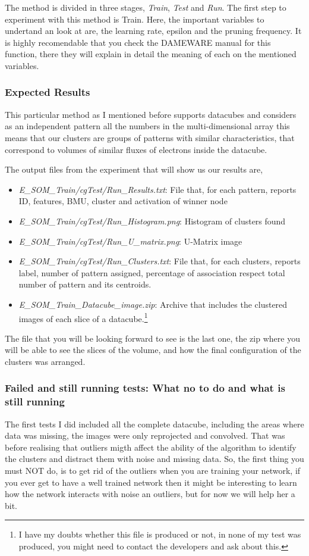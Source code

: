 \documentclass[11pt,fleqn]{book} %
\begin{document}
The method is divided in three stages, \emph{Train}, \emph{Test} and \emph{Run}.
The first step to experiment with this method is Train. Here, the important variables to undertand an look at are, the learning rate, epsilon and the pruning frequency. It is highly recomendable that you check the DAMEWARE manual for this function, there they will explain in detail the meaning of each on the mentioned variables.
\subsubsection{Expected Results}
	This particular method as I mentioned before supports datacubes and considers as an independent pattern all the  numbers in the multi-dimensional array this means that our clusters are groups of patterns with similar characteristics, that correspond to volumes of similar fluxes of electrons inside the datacube.
    
    The output files from the experiment that will show us our results are, 
    \begin{itemize}
    	\item \emph{E\_SOM\_Train/cgTest/Run\_Results.txt}: File that, for each pattern, 
reports ID, features, BMU, cluster and activation of winner node
		\item \emph{E\_SOM\_Train/cgTest/Run\_Histogram.png}: Histogram of clusters found 
        \item \emph{E\_SOM\_Train/cgTest/Run\_U\_matrix.png}: U-Matrix image 
        \item \emph{E\_SOM\_Train/cgTest/Run\_Clusters.txt}: File that, for each clusters, reports label, number of pattern assigned, percentage of association respect total number of pattern and its centroids. 
        \item \emph{E\_SOM\_Train\_Datacube\_image.zip}: Archive that includes the 
clustered images of each slice of a datacube.\footnote{I have my doubts whether this file is produced or not, in none of my test was produced, you might need to contact the developers and ask about this.}
    \end{itemize}
The file that you will be looking forward to see is the last one, the zip where you will be able to see the slices of the volume, and how the final configuration of the clusters was arranged.

\subsubsection{Failed and still running tests: What no to do and what is still running}
The first tests I did included all the complete datacube, including the areas where data was missing, the images were only reprojected and convolved. That was before realising that outliers migth affect the ability of the algorithm to identify the clusters and distract them with noise and missing data. So, the first thing you must NOT do, is to get rid of the outliers when you are training your network, if you ever get to have a well trained network then it might be interesting to learn how the network interacts with noise an outliers, but for now we will help her a bit. 
\end{document}
